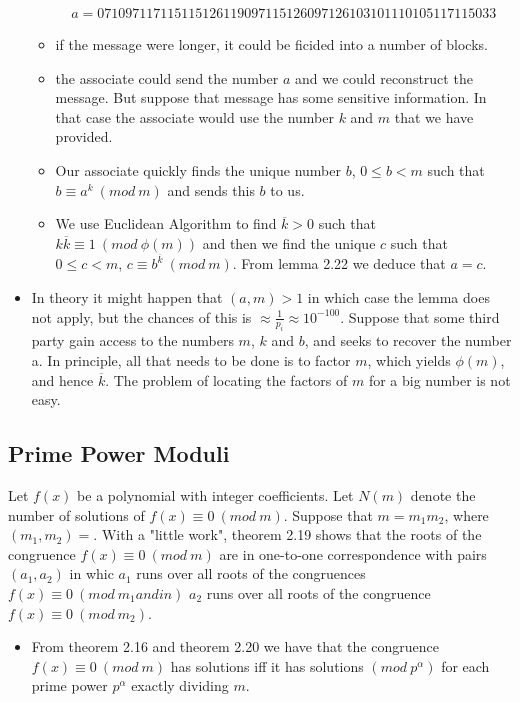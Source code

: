\documentclass[a4paper]{article}
\begin{document}
\begin{itemize}
\begin{itemize}
        \begin{align*}
            a=071097117115115126119097115126097126103101110105117115033
        \end{align*}
        \item if the message were longer, it could be ficided into a number of blocks.
        \item the associate could send the number $a$ and we could reconstruct the message. But suppose that message has some sensitive information. In that case the associate would use the number $k$ and $m$ that we have provided.
        \item Our associate quickly finds the unique number $b$, $0\leq b<m$ such that $b\equiv a^k\ (mod\ m)$ and sends this $b$ to us.
        \item We use Euclidean Algorithm to find $\overline{k}>0$ such that\\
        $k\overline{k}\equiv 1\ (mod\ \phi(m))$ and then we find the unique $c$ such that $0\leq c<m$, $c\equiv b^{\overline{k}}\ (mod\ m)$. From lemma 2.22 we deduce that $a=c$.
    \end{itemize}
    \item In theory it might happen that $(a,m)>1$ in which case the lemma does not apply, but the chances of this is $\approx\frac{1}{p_i}\approx 10^{-100}$. Suppose that some third party gain access to the numbers $m$, $k$ and $b$, and seeks to recover the number a. In principle, all that needs to be done is to factor $m$, which yields $\phi(m)$, and hence $\overline{k}$. The problem of locating the factors of $m$ for a big number is not easy.
\end{itemize}


\subsection{Prime Power Moduli}

Let $f(x)$ be a polynomial with integer coefficients. Let $N(m)$ denote the number of solutions of $f(x)\equiv 0\ (mod\ m)$. Suppose that $m=m_1m_2$, where $(m_1,m_2)=$. With a "little work", theorem 2.19 shows that the roots of the congruence $f(x)\equiv 0\ (mod\ m)$ are in one-to-one correspondence with pairs $(a_1,a_2)$ in whic $a_1$ runs over all roots of the congruences $f(x)\equiv 0\ (mod\ m_1and in)$ $a_2$ runs over all roots of the congruence $f(x)\equiv 0\ (mod\ m_2)$.

\begin{itemize}
    \item From theorem 2.16 and theorem 2.20 we have that the congruence $f(x)\equiv 0\ (mod\ m)$ has solutions iff it has solutions $(mod\ p^\alpha)$ for each prime power $p^\alpha$ exactly dividing $m$.
\end{itemize}
\end{document}
